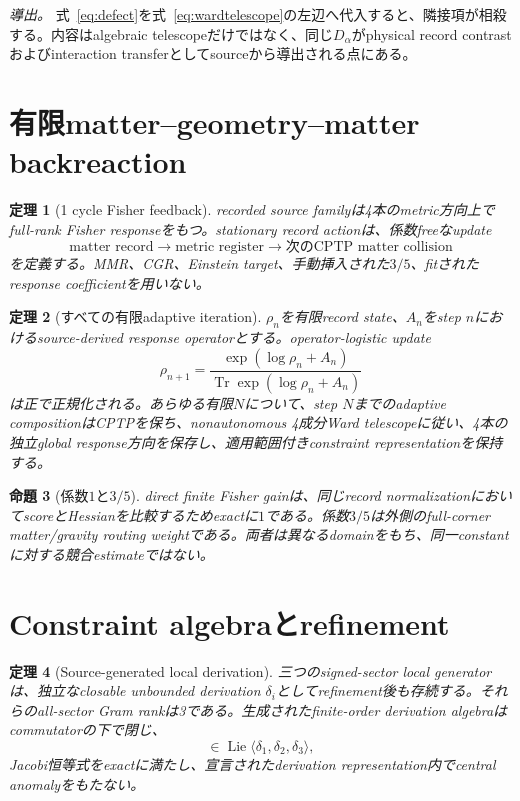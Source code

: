 \documentclass[11pt]{article}
\newtheorem{theorem}{定理}[section]
\newtheorem{proposition}[theorem]{命題}
\theoremstyle{definition}
\theoremstyle{remark}
\newcommand{\Tr}{\operatorname{Tr}}
\begin{document}
\textit{導出。} 式~\eqref{eq:defect}を式~\eqref{eq:wardtelescope}の左辺へ代入すると、隣接項が相殺する。内容はalgebraic telescopeだけではなく、同じ$D_\alpha$がphysical record contrastおよびinteraction transferとしてsourceから導出される点にある。

\section{有限matter--geometry--matter backreaction}

\begin{theorem}[1 cycle Fisher feedback]
recorded source familyは4本のmetric方向上でfull-rank Fisher responseをもつ。stationary record actionは、係数freeなupdate
\begin{equation}
\text{matter record}\longrightarrow
\text{metric register}\longrightarrow
\text{次のCPTP matter collision}
\end{equation}
を定義する。MMR、CGR、Einstein target、手動挿入された$3/5$、fitされたresponse coefficientを用いない。
\end{theorem}

\begin{theorem}[すべての有限adaptive iteration]
$\rho_n$を有限record state、$A_n$をstep $n$におけるsource-derived response operatorとする。operator-logistic update
\begin{equation}
\rho_{n+1}
=\frac{\exp(\log\rho_n+A_n)}{\Tr\exp(\log\rho_n+A_n)}
\label{eq:logistic}
\end{equation}
は正で正規化される。あらゆる有限$N$について、step $N$までのadaptive compositionはCPTPを保ち、nonautonomous 4成分Ward telescopeに従い、4本の独立global response方向を保存し、適用範囲付きconstraint representationを保持する。
\end{theorem}

\begin{proposition}[係数$1$と$3/5$]
direct finite Fisher gainは、同じrecord normalizationにおいてscoreとHessianを比較するためexactに$1$である。係数$3/5$は外側のfull-corner matter/gravity routing weightである。両者は異なるdomainをもち、同一constantに対する競合estimateではない。
\end{proposition}

\section{Constraint algebraとrefinement}

\begin{theorem}[Source-generated local derivation]
三つのsigned-sector local generatorは、独立なclosable unbounded derivation $\delta_i$としてrefinement後も存続する。それらのall-sector Gram rankは3である。生成されたfinite-order derivation algebraはcommutatorの下で閉じ、
\begin{equation}
[\delta_i,\delta_j]\in\operatorname{Lie}\langle\delta_1,\delta_2,\delta_3\rangle,
\end{equation}
Jacobi恒等式をexactに満たし、宣言されたderivation representation内でcentral anomalyをもたない。
\end{theorem}
\end{document}
